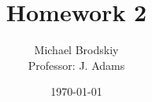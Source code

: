 


\title{Homework 2}
\date{\today}
\author{Michael Brodskiy\\ \small Professor: J. Adams}



\maketitle

